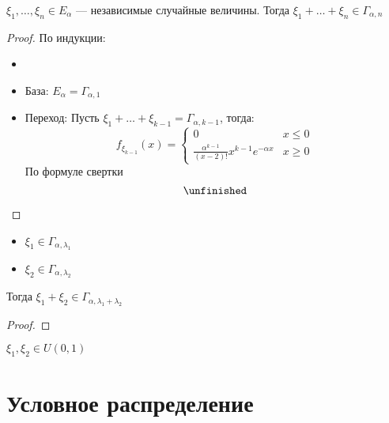 \begin{example}
    \(\xi_1, \dots, \xi_n \in E_\alpha\) --- независимые случайные величины. Тогда \(\xi_1 + \dots + \xi_n \in \Gamma_{\alpha, n}\)
\end{example}
\begin{proof}
    По индукции:
    \begin{itemize}
        \item \item База: \(E_\alpha = \Gamma_{\alpha, 1}\)
        \item Переход: Пусть \(\xi_1 + \dots + \xi_{k - 1} = \Gamma_{\alpha, k - 1}\), тогда:
              \[ f_{\xi_{k - 1}}(x) = \begin{cases}
                      0                                                     & x \le 0 \\
                      \frac{\alpha^{k - 1}}{(x - 2)!}x^{k - 1}e^{-\alpha x} & x \ge 0
                  \end{cases} \]
              По формуле свертки
              \[ \unfinished \]
    \end{itemize}
\end{proof}
\begin{example}\itemfix
    \begin{itemize}
        \item \(\xi_1 \in \Gamma_{\alpha, \lambda_1}\)
        \item \(\xi_2 \in \Gamma_{\alpha, \lambda_2}\)
    \end{itemize}
    Тогда \(\xi_1 + \xi_2 \in \Gamma_{\alpha, \lambda_1 + \lambda_2}\)
\end{example}
\begin{proof}
    \unfinished
\end{proof}
\begin{example}
    \(\xi_1, \xi_2 \in U(0, 1)\)
\end{example}

\section{Условное распределение}

